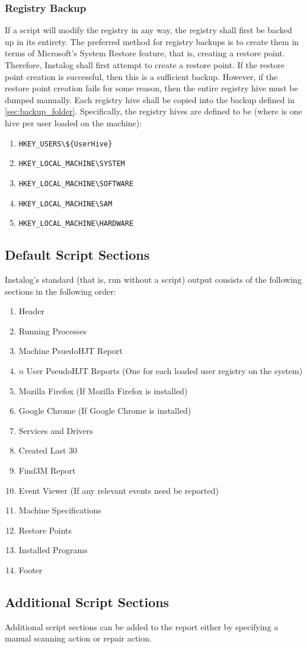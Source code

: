 \subsubsection{Registry Backup} \label{sec:reg_backup}
If a script will modify the registry in any way, the registry shall first be
backed up in its entirety.  The preferred method for registry backups is to
create them in terms of Microsoft's System Restore feature, that is, creating a
restore point. Therefore, Instalog shall first attempt to create a restore point. If
the restore point creation is successful, then this is a sufficient backup.
However, if the restore point creation fails for some reason, then the entire
registry hive must be dumped manually.  Each registry hive shall be copied into
the backup defined in \ref{sec:backup_folder}. Specifically, the registry hives
are defined to be (where  is one hive per user loaded on the
machine):
\begin{enumerate}
    \item \verb|HKEY_USERS\${UserHive}|
    \item \verb|HKEY_LOCAL_MACHINE\SYSTEM|
    \item \verb|HKEY_LOCAL_MACHINE\SOFTWARE|
    \item \verb|HKEY_LOCAL_MACHINE\SAM|
    \item \verb|HKEY_LOCAL_MACHINE\HARDWARE|
\end{enumerate}

\subsection{Default Script Sections} \label{sec:default_script_sections}
Instalog's standard (that is, run without a script) output consists of the
following sections in the following order:
\begin{enumerate}
    \item Header
    \item Running Processes
    \item Machine PsuedoHJT Report
    \item $n$ User PseudoHJT Reports (One for each loaded user registry on the
    system)
    \item Mozilla Firefox (If Mozilla Firefox is installed)
    \item Google Chrome (If Google Chrome is installed)
    \item Services and Drivers
    \item Created Last 30
    \item Find3M Report
    \item Event Viewer (If any relevant events need be reported)
    \item Machine Specifications
    \item Restore Points
    \item Installed Programs
    \item Footer
\end{enumerate}

\subsection{Additional Script Sections}
Additional script sections can be added to the report either by specifying a
manual scanning action or repair action.

